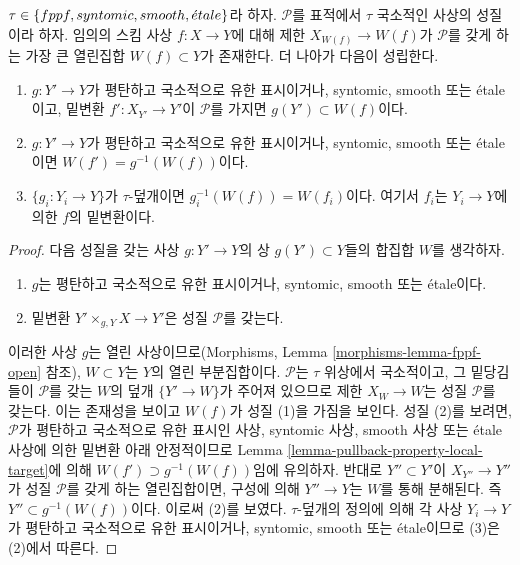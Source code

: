 \begin{lemma}
\label{lemma-largest-open-of-the-base}
$\tau \in \{fppf, syntomic, smooth, {\acute{e}tale}\}$라 하자.
$\mathcal{P}$를 표적에서 $\tau$ 국소적인 사상의 성질이라 하자. 임의의
스킴 사상 $f : X \to Y$에 대해 제한 $X_{W(f)} \to W(f)$가
$\mathcal{P}$를 갖게 하는 가장 큰 열린집합 $W(f) \subset Y$가 존재한다.
더 나아가 다음이 성립한다.
\begin{enumerate}
\item $g : Y' \to Y$가 평탄하고 국소적으로 유한 표시이거나, syntomic,
smooth 또는 \'etale이고, 밑변환 $f' : X_{Y'} \to Y'$이 $\mathcal{P}$를
가지면 $g(Y') \subset W(f)$이다.
\item $g : Y' \to Y$가 평탄하고 국소적으로 유한 표시이거나, syntomic,
smooth 또는 \'etale이면 $W(f') = g^{-1}(W(f))$이다.
\item $\{g_i : Y_i \to Y\}$가 $\tau$-덮개이면
$g_i^{-1}(W(f)) = W(f_i)$이다. 여기서 $f_i$는 $Y_i \to Y$에 의한
$f$의 밑변환이다.
\end{enumerate}
\end{lemma}

\begin{proof}
다음 성질을 갖는 사상 $g : Y' \to Y$의 상 $g(Y') \subset Y$들의 합집합
$W$를 생각하자.
\begin{enumerate}
\item $g$는 평탄하고 국소적으로 유한 표시이거나, syntomic, smooth 또는
\'etale이다.
\item 밑변환 $Y' \times_{g, Y} X \to Y'$은 성질 $\mathcal{P}$를 갖는다.
\end{enumerate}
이러한 사상 $g$는 열린 사상이므로(Morphisms, Lemma
\ref{morphisms-lemma-fppf-open} 참조), $W \subset Y$는 $Y$의 열린
부분집합이다. $\mathcal{P}$는 $\tau$ 위상에서 국소적이고, 그 밑당김들이
$\mathcal{P}$를 갖는 $W$의 덮개 $\{Y' \to W\}$가 주어져 있으므로 제한
$X_W \to W$는 성질 $\mathcal{P}$를 갖는다. 이는 존재성을 보이고
$W(f)$가 성질 (1)을 가짐을 보인다. 성질 (2)를 보려면, $\mathcal{P}$가
평탄하고 국소적으로 유한 표시인 사상, syntomic 사상, smooth 사상 또는
\'etale 사상에 의한 밑변환 아래 안정적이므로 Lemma
\ref{lemma-pullback-property-local-target}에 의해
$W(f') \supset g^{-1}(W(f))$임에 유의하자. 반대로 $Y'' \subset Y'$이
$X_{Y''} \to Y''$가 성질 $\mathcal{P}$를 갖게 하는 열린집합이면, 구성에
의해 $Y'' \to Y$는 $W$를 통해 분해된다. 즉
$Y'' \subset g^{-1}(W(f))$이다. 이로써 (2)를 보였다. $\tau$-덮개의
정의에 의해 각 사상 $Y_i \to Y$가 평탄하고 국소적으로 유한 표시이거나,
syntomic, smooth 또는 \'etale이므로 (3)은 (2)에서 따른다.
\end{proof}

